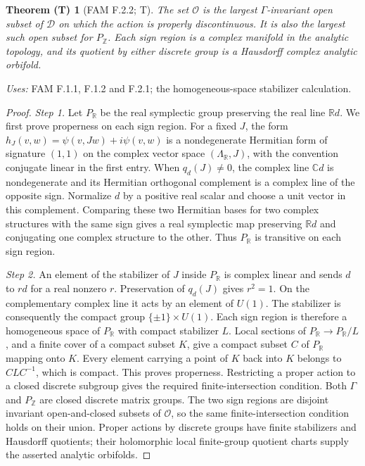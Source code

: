 \documentclass[11pt,a4paper]{article}
\theoremstyle{plain}
\newtheorem{theorem}{Theorem (T)}[section]
\theoremstyle{definition}
\begin{document}
\begin{theorem}[FAM F.2.2; T]\label{fam:F.2.2}
The set $\mathcal O$ is the largest $\Gamma$-invariant open subset of
$\mathcal D$ on which the action is properly discontinuous.  It is also
the largest such open subset for $P_{\mathbb Z}$.  Each sign region is
a complex manifold in the analytic topology, and its quotient by either
discrete group is a Hausdorff complex analytic orbifold.
\end{theorem}
\noindent\emph{Uses:} FAM F.1.1, F.1.2 and F.2.1; the homogeneous-space stabilizer calculation.\par

\begin{proof}
\par\noindent\textit{Step 1.} Let $P_{\mathbb R}$ be the real symplectic group preserving the real line
$\mathbb Rd$.  We first prove properness on each sign region.  For a fixed
$J$, the form
$h_J(v,w)=\psi(v,Jw)+i\psi(v,w)$ is a nondegenerate Hermitian form of
signature $(1,1)$ on the complex vector space $(\Lambda_{\mathbb R},J)$,
with the convention conjugate linear in the first entry.  When
$q_d(J)\ne0$, the complex line $\mathbb Cd$ is nondegenerate and its
Hermitian orthogonal complement is a complex line of the opposite sign.
Normalize $d$ by a positive real scalar and choose a unit vector in this
complement.  Comparing these two Hermitian bases for two complex
structures with the same sign gives a real symplectic map preserving
$\mathbb Rd$ and conjugating one complex structure to the other.  Thus
$P_{\mathbb R}$ is transitive on each sign region.

\par\noindent\textit{Step 2.} An element of the stabilizer of $J$ inside $P_{\mathbb R}$ is complex
linear and sends $d$ to $r d$ for a real nonzero $r$.  Preservation of
$q_d(J)$ gives $r^2=1$.  On the complementary complex line it acts by an
element of $U(1)$.  The stabilizer is consequently the compact group
$\{\pm1\}\times U(1)$.  Each sign region is therefore a homogeneous
space of $P_{\mathbb R}$ with compact stabilizer $L$.  Local sections of
$P_{\mathbb R}\to P_{\mathbb R}/L$, and a finite cover of a compact
subset $K$, give a compact subset $C$ of $P_{\mathbb R}$ mapping onto
$K$.  Every element carrying a point of $K$ back into $K$ belongs to
$CLC^{-1}$, which is compact.  This proves properness.  Restricting a
proper action to a closed discrete subgroup gives
the required finite-intersection condition.  Both $\Gamma$ and
$P_{\mathbb Z}$ are closed discrete matrix groups.  The two sign regions
are disjoint invariant open-and-closed subsets of $\mathcal O$, so the
same finite-intersection condition holds on their union.  Proper actions
by discrete groups have finite stabilizers and Hausdorff quotients; their
holomorphic local finite-group quotient charts supply the asserted
analytic orbifolds.


\end{proof}
\end{document}
